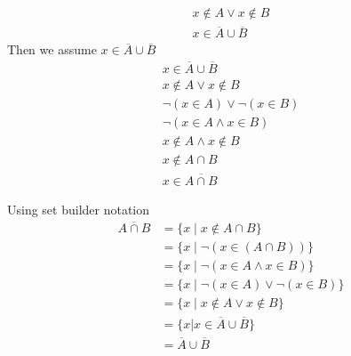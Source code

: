 \documentclass[12pt letter]{report}
\begin{document}
{\begin{myproof}
\begin{align*}
      x \notin A \vee x \notin B \tag*{Definition of Complement}                            \\
      x \in \overline{A} \cup \overline{B} \tag*{Definition of union}
    \end{align*}
    Then we assume $x \in \overline{A} \cup \overline{B}$
    \begin{align*}
      x \in \overline{A} \cup \overline{B} \tag*{Assumption}                                               \\
      x \notin A \vee x \notin B \tag*{Definition of union}                                                \\
      \neg \left( x \in A \right)  \vee  \neg \left( x \in B \right)  \tag*{Definition of Complement}      \\
      \neg \left( x \in A \wedge  x \in B \right) \tag*{By Second De Morgan's Law for propositional logic} \\
      x \notin A \wedge x \notin B \tag*{Definition of Complement}                                         \\
      x \notin A \cap B \tag*{Definition of intersection}                                                  \\
      x \in \overline{A \cap B} \tag*{Definition of Complement}
    \end{align*}

  \end{myproof}
  \noindent Using set builder notation
  \begin{align*}
    \overline{A \cap B} & = \{ x  \mid x \notin A \cap B\} \tag*{Definition of Complement}                                                \\
                        & = \{x  \mid \neg \left( x \in \left( A \cap B \right)  \right) \} \tag*{Definition of $\notin$}                 \\
                        & = \{x  \mid \neg \left( x \in A \wedge x \in B \right) \} \tag*{Definition of Intersection}                     \\
                        & = \{x  \mid \neg \left( x \in A \right) \vee \neg \left( x \in B \right)  \} \tag*{By First De Morgan's Law for
    propositional logic}                                                                                                                  \\
                        & = \{x  \mid x \notin A \vee x \notin B\} \tag*{Definition of Complement}                                        \\
                        & = \{x | x \in \overline{A} \cup \overline{B}\} \tag*{Definition of union}                                       \\
                        & = \overline{A} \cup \overline{B}                                                                                \\
  \end{align*}
}
\end{document}
